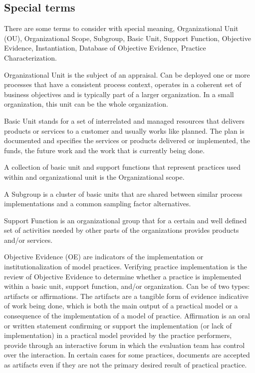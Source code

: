 \subsection{Special terms}
There are some terms to consider with special meaning, Organizational Unit (OU), Organizational Scope, Subgroup, Basic Unit, Support Function, Objective Evidence, Instantiation, Database of Objective Evidence, Practice Characterization.

Organizational Unit is the subject of an appraisal. Can be deployed one or more processes that have a consistent process context, operates in a coherent set of business objectives and is typically part of a larger organization. In a small organization, this unit can be the whole organization.

Basic Unit stands for a set of interrelated and managed resources that delivers products or services to a customer and usually works like planned. The plan is documented and specifies the services or products delivered or implemented, the funds, the future work and the work that is currently being done.

A collection of basic unit and support functions that represent practices used within and organizational unit is the Organizational scope.


A Subgroup is a cluster of basic units that are shared between similar process implementations and a common sampling factor alternatives.

Support Function is an organizational group that for a certain and well defined set of activities needed by other parts of the organizations provides products and/or services.


Objective Evidence (OE) are indicators of the implementation or institutionalization of model practices. Verifying practice implementation is the review of Objective Evidence to determine whether a practice is implemented within a basic unit, support function, and/or organization. Can be of two types: artifacts or affirmations.
The artifacts are a tangible form of evidence indicative of work being done, which is both the main output of a practical model or a consequence of the implementation of a model of practice.
Affirmation is an oral or written statement confirming or support the implementation (or lack of implementation) in a practical model
provided by the practice performers, provide through an interactive forum in which the evaluation team has control over the
interaction.
In certain cases for some practices, documents are accepted as artifacts even if they are not the primary desired result of practical practice.

